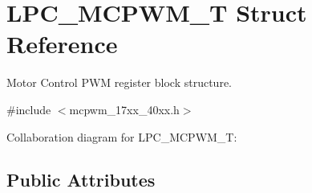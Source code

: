 \hypertarget{structLPC__MCPWM__T}{}\section{L\+P\+C\+\_\+\+M\+C\+P\+W\+M\+\_\+T Struct Reference}
\label{structLPC__MCPWM__T}


Motor Control P\+WM register block structure.  




{\ttfamily \#include $<$mcpwm\+\_\+17xx\+\_\+40xx.\+h$>$}



Collaboration diagram for L\+P\+C\+\_\+\+M\+C\+P\+W\+M\+\_\+T\+:
\subsection*{Public Attributes}
